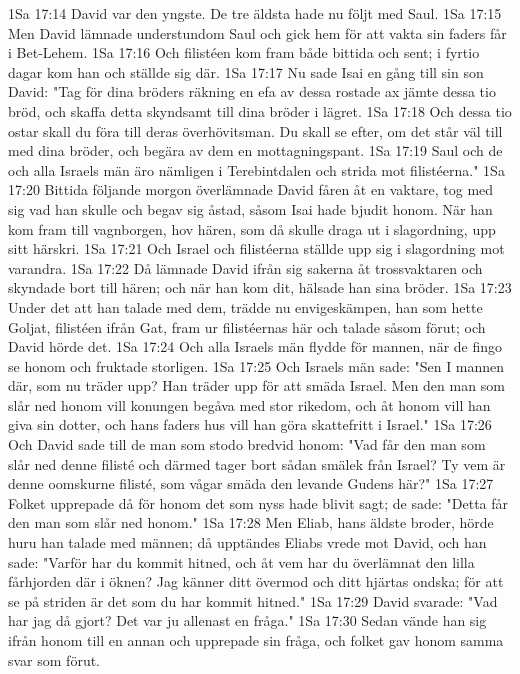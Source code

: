 1Sa 17:14  David var den yngste. De tre äldsta hade nu följt med Saul.
1Sa 17:15  Men David lämnade understundom Saul och gick hem för att vakta sin faders får i Bet-Lehem.
1Sa 17:16  Och filistéen kom fram både bittida och sent; i fyrtio dagar kom han och ställde sig där.
1Sa 17:17  Nu sade Isai en gång till sin son David: "Tag för dina bröders räkning en efa av dessa rostade ax jämte dessa tio bröd, och skaffa detta skyndsamt till dina bröder i lägret.
1Sa 17:18  Och dessa tio ostar skall du föra till deras överhövitsman. Du skall se efter, om det står väl till med dina bröder, och begära av dem en mottagningspant.
1Sa 17:19  Saul och de och alla Israels män äro nämligen i Terebintdalen och strida mot filistéerna."
1Sa 17:20  Bittida följande morgon överlämnade David fåren åt en vaktare, tog med sig vad han skulle och begav sig åstad, såsom Isai hade bjudit honom. När han kom fram till vagnborgen, hov hären, som då skulle draga ut i slagordning, upp sitt härskri.
1Sa 17:21  Och Israel och filistéerna ställde upp sig i slagordning mot varandra.
1Sa 17:22  Då lämnade David ifrån sig sakerna åt trossvaktaren och skyndade bort till hären; och när han kom dit, hälsade han sina bröder.
1Sa 17:23  Under det att han talade med dem, trädde nu envigeskämpen, han som hette Goljat, filistéen ifrån Gat, fram ur filistéernas här och talade såsom förut; och David hörde det.
1Sa 17:24  Och alla Israels män flydde för mannen, när de fingo se honom och fruktade storligen.
1Sa 17:25  Och Israels män sade: "Sen I mannen där, som nu träder upp? Han träder upp för att smäda Israel. Men den man som slår ned honom vill konungen begåva med stor rikedom, och åt honom vill han giva sin dotter, och hans faders hus vill han göra skattefritt i Israel."
1Sa 17:26  Och David sade till de man som stodo bredvid honom: "Vad får den man som slår ned denne filisté och därmed tager bort sådan smälek från Israel? Ty vem är denne oomskurne filisté, som vågar smäda den levande Gudens här?"
1Sa 17:27  Folket upprepade då för honom det som nyss hade blivit sagt; de sade: "Detta får den man som slår ned honom."
1Sa 17:28  Men Eliab, hans äldste broder, hörde huru han talade med männen; då upptändes Eliabs vrede mot David, och han sade: "Varför har du kommit hitned, och åt vem har du överlämnat den lilla fårhjorden där i öknen? Jag känner ditt övermod och ditt hjärtas ondska; för att se på striden är det som du har kommit hitned."
1Sa 17:29  David svarade: "Vad har jag då gjort? Det var ju allenast en fråga."
1Sa 17:30  Sedan vände han sig ifrån honom till en annan och upprepade sin fråga, och folket gav honom samma svar som förut.
